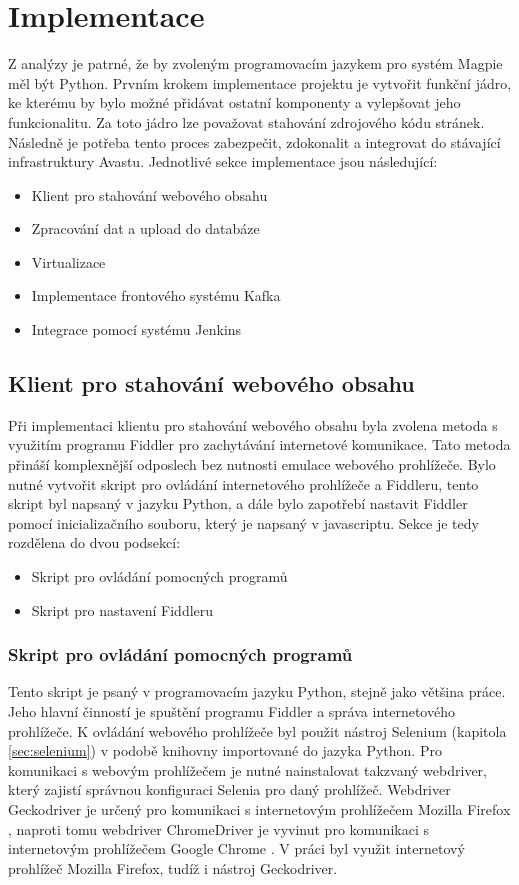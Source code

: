 \documentclass[thesis=M,czech,hidelinks]{FITthesis}[2013/05/06]
\begin{document}
\chapter{Implementace}
Z analýzy je patrné, že by zvoleným programovacím jazykem pro systém Magpie měl být Python. Prvním krokem implementace projektu je vytvořit funkční jádro, ke kterému by bylo možné přidávat ostatní komponenty a vylepšovat jeho funkcionalitu. Za toto jádro lze považovat stahování zdrojového kódu stránek. Následně je potřeba tento proces zabezpečit, zdokonalit a integrovat do stávající infrastruktury Avastu. Jednotlivé sekce implementace jsou následující:
\begin{itemize}
	\item Klient pro stahování webového obsahu
	\item Zpracování dat a upload do databáze
	\item Virtualizace 
	\item Implementace frontového systému Kafka
	\item Integrace pomocí systému Jenkins
\end{itemize} 




\section{Klient pro stahování webového obsahu} \label{sec:stahovani}
Při implementaci klientu pro stahování webového obsahu byla zvolena metoda s využitím programu Fiddler pro zachytávání internetové komunikace. Tato metoda přináší komplexnější odposlech bez nutnosti emulace webového prohlížeče. Bylo nutné vytvořit skript pro ovládání internetového prohlížeče a Fiddleru, tento skript byl napsaný v jazyku Python, a dále bylo zapotřebí nastavit Fiddler pomocí inicializačního souboru, který je napsaný v javascriptu. Sekce je tedy rozdělena do dvou podsekcí:
\begin{itemize}
	\item Skript pro ovládání pomocných programů
	\item Skript pro nastavení Fiddleru
\end{itemize}

\subsection{Skript pro ovládání pomocných programů}
Tento skript je psaný v programovacím jazyku Python, stejně jako většina práce. Jeho hlavní činností je spuštění programu Fiddler a správa internetového prohlížeče. K ovládání webového prohlížeče byl použit nástroj Selenium (kapitola \ref{sec:selenium}) v podobě knihovny importované do jazyka Python. Pro komunikaci s webovým prohlížečem je nutné nainstalovat takzvaný webdriver, který zajistí správnou konfiguraci Selenia pro daný prohlížeč. Webdriver Geckodriver \cite{gecko} je určený pro komunikaci s internetovým prohlížečem Mozilla Firefox \cite{firefox}, naproti tomu webdriver ChromeDriver \cite{chromedriver}  je vyvinut  pro komunikaci s internetovým prohlížečem Google Chrome \cite{chrome}. V práci byl využit internetový prohlížeč Mozilla Firefox, tudíž i nástroj Geckodriver.
\end{document}
